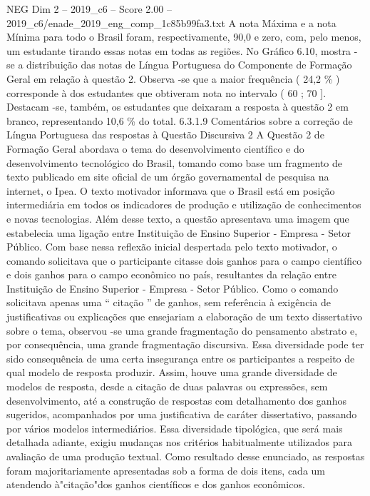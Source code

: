 \begin{textsample}{NEG Dim 2 – 2019\_c6 – Score 2.00 – 2019\_c6/enade\_2019\_eng\_comp\_1c85b99fa3.txt}
A nota Máxima e a nota Mínima para todo o Brasil foram, respectivamente, 90,0 e zero, com, pelo menos, um estudante tirando essas notas em todas as regiões.
No Gráfico 6.10, mostra -se a distribuição das notas de Língua Portuguesa do Componente de Formação Geral em relação à questão 2.
Observa -se que a maior frequência ( 24,2 \% ) corresponde à dos estudantes que obtiveram nota no intervalo ( 60 ; 70 ].
Destacam -se, também, os estudantes que deixaram a resposta à questão 2 em branco, representando 10,6 \% do total. 6.3.1.9 Comentários sobre a correção de Língua Portuguesa das respostas à Questão Discursiva 2 A Questão 2 de Formação Geral abordava o tema do desenvolvimento científico e do desenvolvimento tecnológico do Brasil, tomando como base um fragmento de texto publicado em site oficial de um órgão governamental de pesquisa na internet, o Ipea.
O texto motivador informava que o Brasil está em posição intermediária em todos os indicadores de produção e utilização de conhecimentos e novas tecnologias.
Além desse texto, a questão apresentava uma imagem que estabelecia uma ligação entre Instituição de Ensino Superior - Empresa - Setor Público.
Com base nessa reflexão inicial despertada pelo texto motivador, o comando solicitava que o participante citasse dois ganhos para o campo científico e dois ganhos para o campo econômico no país, resultantes da relação entre Instituição de Ensino Superior - Empresa - Setor Público.
Como o comando solicitava apenas uma “ citação ” de ganhos, sem referência à exigência de justificativas ou explicações que ensejariam a elaboração de um texto dissertativo sobre o tema, observou -se uma grande fragmentação do pensamento abstrato e, por consequência, uma grande fragmentação discursiva.
Essa diversidade pode ter sido consequência de uma certa insegurança entre os participantes a respeito de qual modelo de resposta produzir.
Assim, houve uma grande diversidade de modelos de resposta, desde a citação de duas palavras ou expressões, sem desenvolvimento, até a construção de respostas com detalhamento dos ganhos sugeridos, acompanhados por uma justificativa de caráter dissertativo, passando por vários modelos intermediários.
Essa diversidade tipológica, que será mais detalhada adiante, exigiu mudanças nos critérios habitualmente utilizados para avaliação de uma produção textual.
Como resultado desse enunciado, as respostas foram majoritariamente apresentadas sob a forma de dois itens, cada um atendendo à"citação"dos ganhos científicos e dos ganhos econômicos.

\end{textsample}
